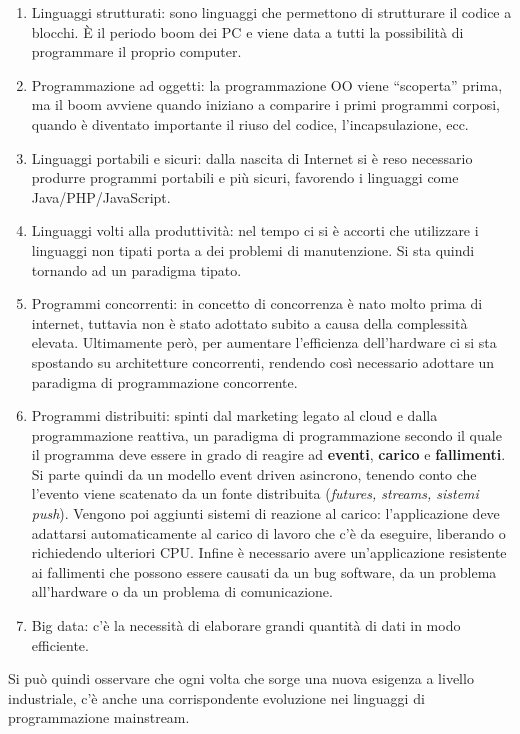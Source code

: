 \begin{enumerate}
	\item Linguaggi strutturati: sono linguaggi che permettono di strutturare il codice a blocchi. \`E il periodo boom dei PC e viene data a tutti la possibilità di programmare il proprio computer.
	\item Programmazione ad oggetti: la programmazione OO viene ``scoperta'' prima, ma il boom avviene quando iniziano a comparire i primi programmi corposi, quando è diventato importante il riuso del codice, l'incapsulazione, ecc.
	\item Linguaggi portabili e sicuri: dalla nascita di Internet si è reso necessario produrre programmi portabili e più sicuri, favorendo i linguaggi come Java/PHP/JavaScript.
	\item Linguaggi volti alla produttività: nel tempo ci si è accorti che utilizzare i linguaggi non tipati porta a dei problemi di manutenzione. Si sta quindi tornando ad un paradigma tipato.
	\item Programmi concorrenti: in concetto di concorrenza è nato molto prima di internet, tuttavia non è stato adottato subito a causa della complessità elevata. Ultimamente però, per aumentare l'efficienza dell'hardware ci si sta spostando su architetture concorrenti, rendendo così necessario adottare un paradigma di programmazione concorrente.
	\item Programmi distribuiti: spinti dal marketing legato al cloud e dalla programmazione reattiva, un paradigma di programmazione secondo il quale il programma deve essere in grado di reagire ad \textbf{eventi}, \textbf{carico} e \textbf{fallimenti}. Si parte quindi da un modello event driven asincrono, tenendo conto che l'evento viene scatenato da un fonte distribuita (\textit{futures, streams, sistemi push}). Vengono poi aggiunti sistemi di reazione al carico: l'applicazione deve adattarsi automaticamente al carico di lavoro che c'è da eseguire, liberando o richiedendo ulteriori CPU. Infine è necessario avere un'applicazione resistente ai fallimenti che possono essere causati da un bug software, da un problema all'hardware o da un problema di comunicazione.
	\item Big data: c'è la necessità di elaborare grandi quantità di dati in modo efficiente.
\end{enumerate}

Si può quindi osservare che ogni volta che sorge una nuova esigenza a livello industriale, c'è anche una corrispondente evoluzione nei linguaggi di programmazione mainstream.

